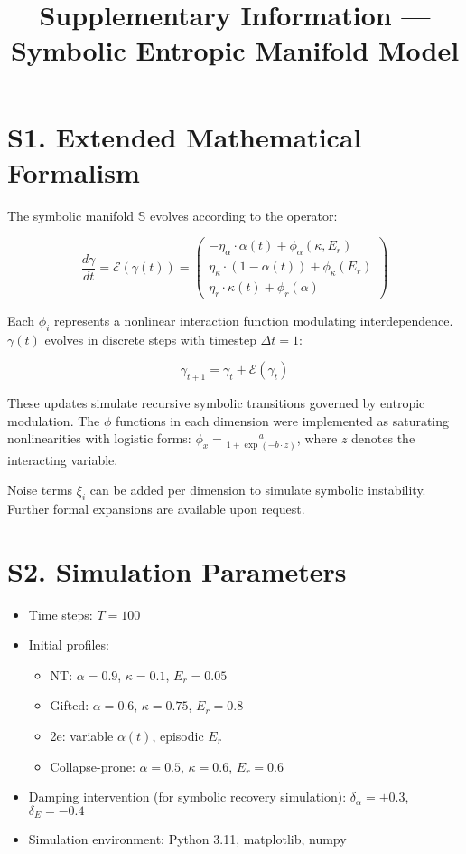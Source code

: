 \documentclass[12pt]{article}
\title{Supplementary Information — Symbolic Entropic Manifold Model}
\date{}
\begin{document}
\maketitle

\section*{S1. Extended Mathematical Formalism}

The symbolic manifold $\mathbb{S}$ evolves according to the operator:

\[
\frac{d\gamma}{dt} = \mathcal{E}(\gamma(t)) =
\begin{pmatrix}
    -\eta_\alpha \cdot \alpha(t) + \phi_\alpha(\kappa,E_r) \\
    \eta_\kappa \cdot (1 - \alpha(t)) + \phi_\kappa(E_r) \\
    \eta_r \cdot \kappa(t) + \phi_r(\alpha)
\end{pmatrix}
\]

Each $\phi_i$ represents a nonlinear interaction function modulating interdependence. $\gamma(t)$ evolves in discrete steps with timestep $\Delta t = 1$:

\[
\gamma_{t+1} = \gamma_t + \mathcal{E}(\gamma_t)
\]

These updates simulate recursive symbolic transitions governed by entropic modulation. The $\phi$ functions in each dimension were implemented as saturating nonlinearities with logistic forms: $\phi_x = \frac{a}{1 + \exp(-b \cdot z)}$, where $z$ denotes the interacting variable.

Noise terms $\xi_i$ can be added per dimension to simulate symbolic instability. Further formal expansions are available upon request.

\section*{S2. Simulation Parameters}

\begin{itemize}
    \item Time steps: $T = 100$
    \item Initial profiles:
    \begin{itemize}
        \item NT: $\alpha=0.9$, $\kappa=0.1$, $E_r=0.05$
        \item Gifted: $\alpha=0.6$, $\kappa=0.75$, $E_r=0.8$
        \item 2e: variable $\alpha(t)$, episodic $E_r$
        \item Collapse-prone: $\alpha=0.5$, $\kappa=0.6$, $E_r=0.6$
    \end{itemize}
    \item Damping intervention (for symbolic recovery simulation): $\delta_\alpha = +0.3$, $\delta_E = -0.4$
    \item Simulation environment: Python 3.11, matplotlib, numpy
\end{itemize}
\end{document}
